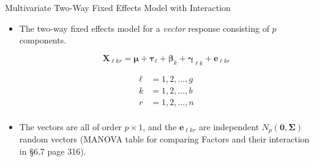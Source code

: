\documentclass[8pt]{beamer}
\begin{document}
    \begin{frame}{Multivariate Two-Way Fixed Effects Model with Interaction}
    
    \begin{itemize}
        \item The two-way fixed effects model for a \textit{vector} response consisting of $p$ components. 

    
        \begin{equation}
            \mathbf{X}_{\ell k r} = \mathbf{\mu} + \mathbf{\tau}_{\ell} + \mathbf{\beta}_{k} + \mathbf{\gamma}_{\ell k} + \mathbf{e}_{\ell k r}
        \end{equation}
            
        \begin{align*}
                \ell &= 1,2,\hdots,g\\
                k &= 1,2,\hdots, b\\
                r &= 1,2,\hdots,n\\
        \end{align*}
            
        \item The vectors are all of order $p \times 1$, and the $\mathbf{e}_{\ell k r}$ are independent $N_{p}(\mathbf{0},\mathbf{\Sigma})$ random vectors (MANOVA table for comparing Factors and their interaction in \S{6.7} page 316).     
        
        
        
        
    \end{itemize}
    \end{frame}
\end{document}
